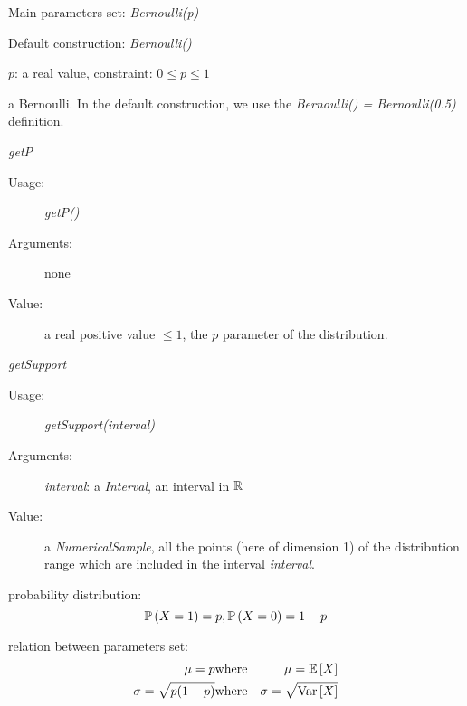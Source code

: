 \begin{description}

\item[Usage:]\rule{0pt}{1em}
\begin{description}
\item Main parameters set: \textit{Bernoulli(p)}
\item  Default construction: \textit{Bernoulli()}
\end{description}

\item[Arguments:]  $p$: a real value,
constraint: $0\leq p\leq 1$

\item[Value:] a Bernoulli. In the default construction, we use the \textit{Bernoulli() = Bernoulli(0.5)} definition.

\item[Some methods:] \rule{0pt}{1em}
\begin{description}

\item \textit{getP}
\begin{description}
\item[Usage:] \textit{getP()}
\item[Arguments:] none
\item[Value:]  a real positive value $\leq 1$, the $p$ parameter of the  distribution.
\end{description}
\bigskip

\item \textit{getSupport}
\begin{description}
\item[Usage:] \textit{getSupport(interval)}
\item[Arguments:] \textit{interval}: a \textit{Interval}, an interval in ${\mathbb R}$
\item[Value:]  a \textit{NumericalSample}, all the points (here of dimension 1) of the distribution range which are included in the interval \textit{interval}.
\end{description}

\end{description}

\item[Details:]  \rule{0pt}{1em}
\begin{description}
\item probability distribution:
\begin{equation}
{\mathbb P}\left( X=1 \right)  = p, {\mathbb P}\left( X=0 \right) = 1-p
\end{equation}
\item relation between parameters set:
\begin{eqnarray*}
\mu  =   p                                              & \mbox{where}& \mu ={\mathbb E}\left[ X \right] \\
\sigma  = \sqrt{p(1-p)}  & \mbox{where}& \sigma =\sqrt{{\rm Var}\left[ X \right] }
\end{eqnarray*}


\end{description}
\end{description}
